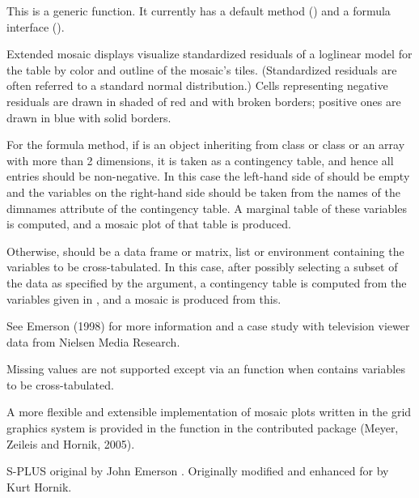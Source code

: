 \begin{Details}\relax
This is a generic function.  It currently has a default method
() and a formula interface
().

Extended mosaic displays visualize standardized residuals of a
loglinear model for the table by color and outline of the mosaic's
tiles.  (Standardized residuals are often referred to a standard
normal distribution.)  Cells representing negative residuals are drawn
in shaded of red and with broken borders; positive ones are drawn in
blue with solid borders.

For the formula method, if  is an object inheriting from
class  or class  or an array with more
than 2 dimensions, it is taken as a contingency table, and hence all
entries should be non-negative.  In this case the left-hand side of
 should be empty and the variables on the right-hand
side should be taken from the names of the dimnames attribute of the
contingency table.  A marginal table of these variables is computed,
and a mosaic plot of that table is produced.

Otherwise,  should be a data frame or matrix, list or
environment containing the variables to be cross-tabulated.  In this
case, after possibly selecting a subset of the data as specified by
the  argument, a contingency table is computed from the
variables given in , and a mosaic is produced from
this.

See Emerson (1998) for more information and a case study with
television viewer data from Nielsen Media Research.

Missing values are not supported except via an 
function when  contains variables to be cross-tabulated.

A more flexible and extensible implementation of mosaic plots written
in the grid graphics system is provided in the function
 in the contributed package 
(Meyer, Zeileis and Hornik, 2005).
\end{Details}
%
\begin{Author}\relax
S-PLUS original by John Emerson .
Originally modified and enhanced for \R{} by Kurt Hornik.
\end{Author}
%
